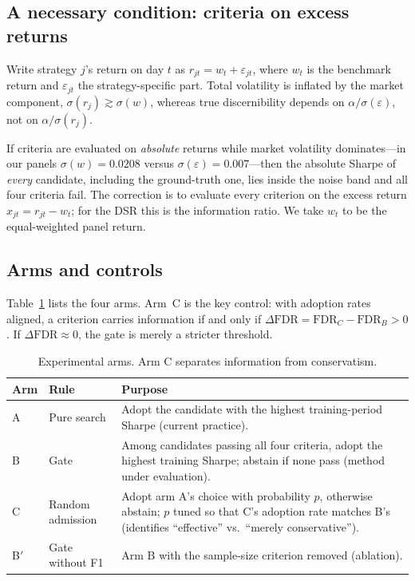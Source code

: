 \documentclass[11pt]{article}
\begin{document}
\subsection{A necessary condition: criteria on excess returns}
\label{sec:excess}

Write strategy $j$'s return on day $t$ as $r_{jt}=w_t+\varepsilon_{jt}$, where $w_t$ is the
benchmark return and $\varepsilon_{jt}$ the strategy-specific part. Total volatility is inflated
by the market component, $\sigma(r_j)\gtrsim\sigma(w)$, whereas true discernibility depends on
$\alpha/\sigma(\varepsilon)$, not on $\alpha/\sigma(r_j)$.

If criteria are evaluated on \emph{absolute} returns while market volatility dominates---in our
panels $\sigma(w)=0.0208$ versus $\sigma(\varepsilon)=0.007$---then the absolute Sharpe of
\emph{every} candidate, including the ground-truth one, lies inside the noise band and all four
criteria fail. The correction is to evaluate every criterion on the excess return
$x_{jt}=r_{jt}-w_t$; for the DSR this is the information ratio. We take $w_t$ to be the
equal-weighted panel return.

\subsection{Arms and controls}
\label{sec:arms}

Table~\ref{tab:arms} lists the four arms. Arm~C is the key control: with adoption rates aligned,
a criterion carries information if and only if
$\Delta\text{FDR}=\text{FDR}_{C}-\text{FDR}_{B}>0$. If $\Delta\text{FDR}\approx0$, the gate is
merely a stricter threshold.

\begin{table}[htbp]
\centering
\caption{Experimental arms. Arm C separates information from conservatism.}
\label{tab:arms}
\small
\begin{tabular}{@{}llp{7.8cm}@{}}
\toprule
\textbf{Arm} & \textbf{Rule} & \textbf{Purpose} \\
\midrule
A & Pure search & Adopt the candidate with the highest training-period Sharpe (current practice). \\
B & Gate & Among candidates passing all four criteria, adopt the highest training Sharpe; abstain if none pass (method under evaluation). \\
C & Random admission & Adopt arm A's choice with probability $p$, otherwise abstain; $p$ tuned so that C's adoption rate matches B's (identifies ``effective'' vs.\ ``merely conservative''). \\
B$'$ & Gate without F1 & Arm B with the sample-size criterion removed (ablation). \\
\bottomrule
\end{tabular}
\end{table}
\end{document}
